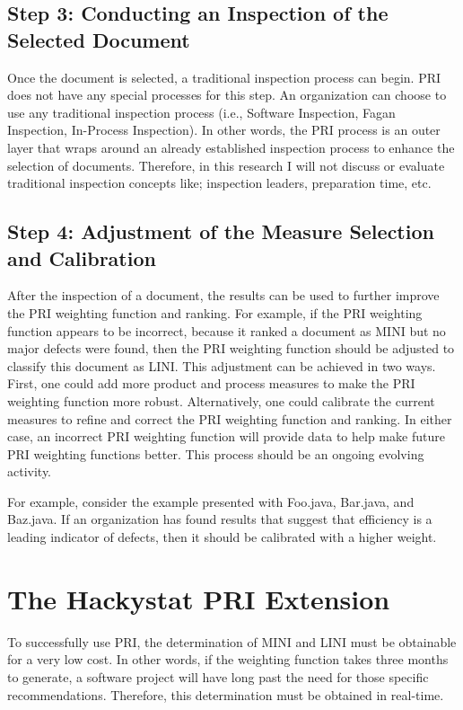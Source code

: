\subsection{Step 3: Conducting an Inspection of the Selected Document}
Once the document is selected, a traditional inspection process can begin.
PRI does not have any special processes for this step. An organization can
choose to use any traditional inspection process (i.e., Software
Inspection, Fagan Inspection, In-Process Inspection). In other words, the
PRI process is an outer layer that wraps around an already established
inspection process to enhance the selection of documents.  Therefore, in
this research I will not discuss or evaluate traditional inspection
concepts like; inspection leaders, preparation time, etc.


\subsection{Step 4: Adjustment of the Measure Selection and Calibration}
After the inspection of a document, the results can be used to further
improve the PRI weighting function and ranking. For example, if the PRI
weighting function appears to be incorrect, because it ranked a document as
MINI but no major defects were found, then the PRI weighting function
should be adjusted to classify this document as LINI. This adjustment can
be achieved in two ways. First, one could add more product and process
measures to make the PRI weighting function more robust. Alternatively, one
could calibrate the current measures to refine and correct the PRI
weighting function and ranking.  In either case, an incorrect PRI weighting
function will provide data to help make future PRI weighting functions
better. This process should be an ongoing evolving activity.

For example, consider the example presented with Foo.java, Bar.java, and
Baz.java. If an organization has found results that suggest that efficiency
is a leading indicator of defects, then it should be calibrated with a
higher weight.



\section{The Hackystat PRI Extension}
To successfully use PRI, the determination of MINI and LINI must be
obtainable for a very low cost. In other words, if the weighting function
takes three months to generate, a software project will have long past the
need for those specific recommendations. Therefore, this determination must
be obtained in real-time.


